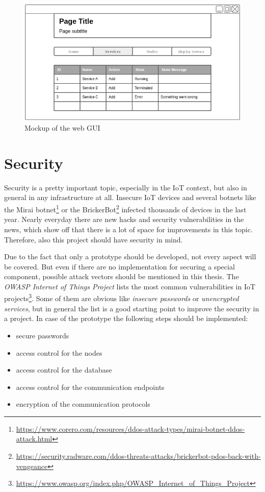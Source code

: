 \begin{figure}[H]
    \centering
    \includegraphics[width=\textwidth]{resources/images/gui_prototype.png}
    \caption[Mockup of the web GUI]{Mockup of the web GUI}
    \label{fig:gui_mockup}
\end{figure}


\section{Security}
Security is a pretty important topic, especially in the \ac{IoT} context, but also in general in any infrastructure at all.
Insecure \ac{IoT} devices and several botnets like the Mirai botnet\footnote{\url{https://www.corero.com/resources/ddos-attack-types/mirai-botnet-ddos-attack.html}} or the BrickerBot\footnote{\url{https://security.radware.com/ddos-threats-attacks/brickerbot-pdos-back-with-vengeance}} infected thousands of devices in the last year.
Nearly everyday there are new hacks and security vulnerabilities in the news, which show off that there is a lot of space for improvements in this topic.
Therefore, also this project should have security in mind.

Due to the fact that only a prototype should be developed, not every aspect will be covered.
But even if there are no implementation for securing a special component, possible attack vectors should be mentioned in this thesis.
The \textit{OWASP Internet of Things Project} lists the most common vulnerabilities in \ac{IoT} projects\footnote{\url{https://www.owasp.org/index.php/OWASP_Internet_of_Things_Project}}.
Some of them are obvious like \textit{insecure passwords} or \textit{unencrypted services}, but in general the list is a good starting point to improve the security in a project.
In case of the prototype the following steps should be implemented:
\begin{itemize}
  \item secure passwords
  \item access control for the nodes
  \item access control for the database
  \item access control for the communication endpoints
  \item encryption of the communication protocols
\end{itemize}


